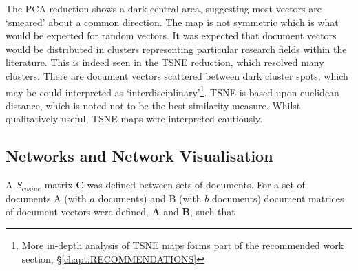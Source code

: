 The PCA reduction shows a dark central area, suggesting most vectors are `smeared' about a common direction. The map is not symmetric which is what would be expected for random vectors. It was expected that document vectors would be distributed in clusters representing particular research fields within the literature. This is indeed seen in the TSNE reduction, which resolved many clusters. There are document vectors scattered between dark cluster spots, which may be could interpreted as `interdisciplinary'\footnote{More in-depth analysis of TSNE maps forms part of the recommended work section, \S\ref{chapt:RECOMMENDATIONS}}.
TSNE is based upon euclidean distance, which is noted not to be the best similarity measure. Whilst qualitatively useful, TSNE maps were interpreted cautiously.
\subsection{Networks and Network Visualisation}
\label{sec:COSINEMAT}
A $S_{cosine}$ matrix $\mathbf{C}$ was defined between sets of documents. For a set of documents  A (with $a$ documents) and B (with $b$ documents) document matrices of document vectors were defined, $\mathbf{A}$ and $\mathbf{B}$, such that 

